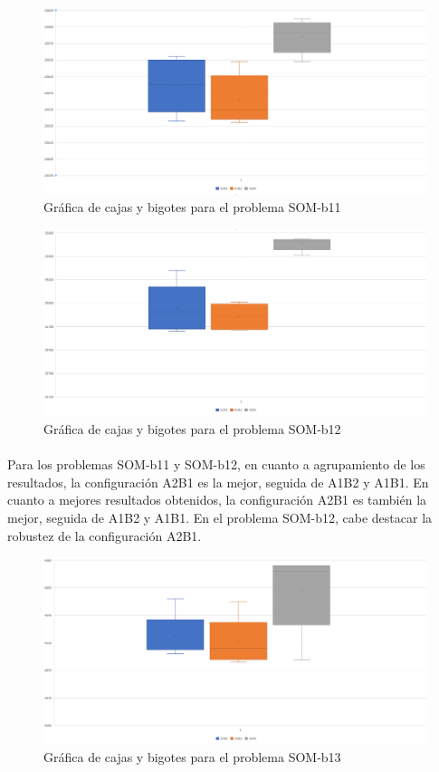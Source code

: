 	\begin{figure}[H]
		\centering
		\includegraphics[scale=0.3]{img/BIGOTESSOM1.png}
		\caption{Gráfica de cajas y bigotes para el problema SOM-b11}
		\label{SOM-b11_bigotes}
	\end{figure}

	\begin{figure}[H]
		\centering
		\includegraphics[scale=0.3]{img/BIGOTESSOM2.png}
		\caption{Gráfica de cajas y bigotes para el problema SOM-b12}
		\label{SOM-b12_bigotes}
	\end{figure}

	\paragraph{}Para los problemas SOM-b11 y SOM-b12, en cuanto a agrupamiento de los resultados, la configuración A2B1 es la mejor, seguida de A1B2 y A1B1. En cuanto a mejores resultados obtenidos, la configuración A2B1 es también la mejor, seguida de A1B2 y A1B1. En el problema SOM-b12, cabe destacar la robustez de la configuración A2B1. 

	\begin{figure}[H]
		\centering
		\includegraphics[scale=0.3]{img/BIGOTESSOM3.png}
		\caption{Gráfica de cajas y bigotes para el problema SOM-b13}
		\label{SOM-b13_bigotes}
	\end{figure}

